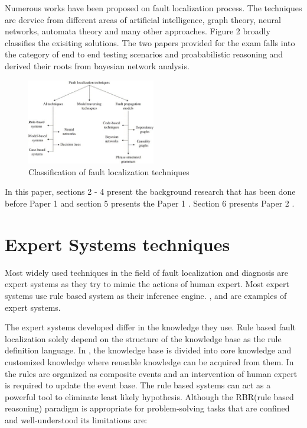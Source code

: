 \documentclass[10pt]{sigplan-proc-varsize}
\begin{document}
Numerous works have been proposed on fault localization process. The techniques are dervice from different areas of artificial intelligence, graph theory, 
neural networks, automata theory and many other approaches. Figure 2 broadly classifies the exisiting solutions. The two papers provided for the exam falls into the 
category of end to end testing scenarios and proababilistic reasoning and derived their roots from bayesian network analysis. 

\begin{figure}[h!]
  \caption{Classification of fault localization techniques}
  \centering
    \includegraphics[width=0.5\textwidth]{Fig2}
\end{figure}

In this paper, sections 2 - 4 present the background research that has been done before Paper 1 \cite{pclee:07} and section 5 presents the Paper 1 \cite{pclee:07}. Section 6 presents Paper 2 \cite{krishna:12} .

\section{Expert Systems techniques}
Most widely used techniques in the field of fault localization and diagnosis are expert systems as they try to mimic the actions of human expert. 
Most expert systems use rule based system as their inference engine. \cite{Peng:97},\cite{Liu:99} and \cite{Nygate:95} are examples of expert systems.

The expert systems developed differ in the knowledge they use. Rule based fault localization solely depend on the 
structure of the knowledge base as the rule definition language. In \cite{Lor:93}, the knowledge base is divided into core knowledge and customized knowledge where reusable knowledge can be acquired from them. In  \cite{Liu:99} the rules are organized as composite events and 
an intervention of human expert is required to update the event base.  The rule based systems can act as a powerful tool to eliminate 
least likely hypothesis. Although the RBR(rule based reasoning) paradigm is appropriate for problem-solving tasks that are confined and well-understood its limitations are:
\end{document}
